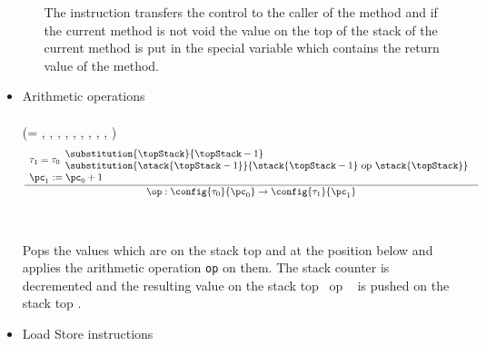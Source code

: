 \begin{itemize}
\begin{enumerate}
	    The instruction transfers the control to the caller of the method and 
            if the current method is not void the value on the top of the stack of the current method is put 
	    in the special variable \result which contains the return value of the method.
	     
      \end{enumerate}








    \item Arithmetic operations \\\\ 	
           \op (\op =  , , , 
	 		, ,  , , , ,  )  \\ 

    $$ \frac{ \begin{array}{l}
		\tau_{1} = \tau_{0} \begin{array}{l}
		                      \substitution{\topStack}{\topStack - 1} \\
	                              \substitution{\stack{\topStack - 1} } {\stack{\topStack - 1} \ \rm{op} \ \stack{\topStack}}
				    \end{array} \\
		\pc_1 := \pc_0 + 1 
		\end{array}
	   } 
	   { \op : \config{\tau_{0}}{\pc_0} \rightarrow \config{\tau_{1}}{\pc_1}}  $$\\\\
 
		  Pops the values which are on the stack top \stack{\topStack}  and   at the position below and applies the arithmetic operation \texttt{op} on them. 
		  The stack counter is decremented and  the resulting  value on the stack top  \ \rm{op} \ \stack{\topStack} is pushed on the stack
		  top  . 
    \item Load Store instructions \\\\

      \begin{enumerate}
    

\end{enumerate}
\end{itemize}
